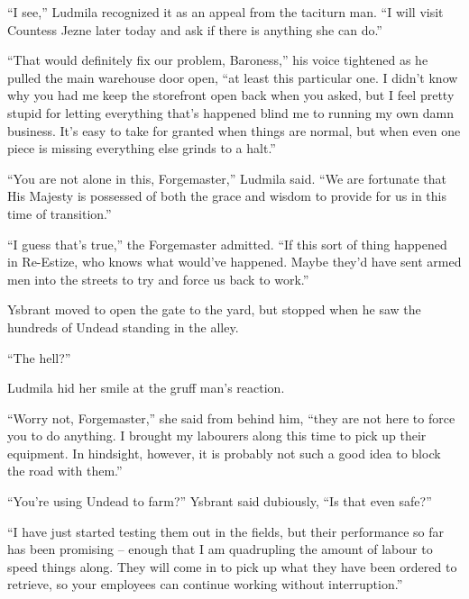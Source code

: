  

“I see,” Ludmila recognized it as an appeal from the taciturn man. “I will visit Countess Jezne later today and ask if there is anything she can do.”

 

“That would definitely fix our problem, Baroness,” his voice tightened as he pulled the main warehouse door open, “at least this particular one. I didn’t know why you had me keep the storefront open back when you asked, but I feel pretty stupid for letting everything that's happened blind me to running my own damn business. It’s easy to take for granted when things are normal, but when even one piece is missing everything else grinds to a halt.”

 

“You are not alone in this, Forgemaster,” Ludmila said. “We are fortunate that His Majesty is possessed of both the grace and wisdom to provide for us in this time of transition.”

 

“I guess that’s true,” the Forgemaster admitted. “If this sort of thing happened in Re-Estize, who knows what would’ve happened. Maybe they’d have sent armed men into the streets to try and force us back to work.”

 

Ysbrant moved to open the gate to the yard, but stopped when he saw the hundreds of Undead standing in the alley.

 

“The hell?”

 

Ludmila hid her smile at the gruff man’s reaction.

 

“Worry not, Forgemaster,” she said from behind him, “they are not here to force you to do anything. I brought my labourers along this time to pick up their equipment. In hindsight, however, it is probably not such a good idea to block the road with them.”

 

“You’re using Undead to farm?” Ysbrant said dubiously, “Is that even safe?”

 

“I have just started testing them out in the fields, but their performance so far has been promising – enough that I am quadrupling the amount of labour to speed things along. They will come in to pick up what they have been ordered to retrieve, so your employees can continue working without interruption.”

